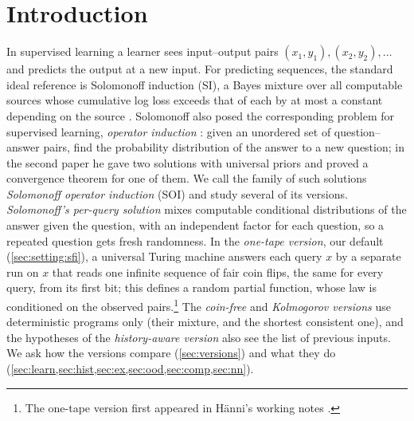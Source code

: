 \section{Introduction}\label{sec:intro}

In supervised learning a learner sees input--output pairs $(x_1,y_1),(x_2,y_2),\dots$ and predicts the output at a new input. For predicting sequences, the standard ideal reference is Solomonoff induction (SI), a Bayes mixture over all computable sources whose cumulative log loss exceeds that of each by at most a constant depending on the source \citep{li2008introduction}. Solomonoff also posed the corresponding problem for supervised learning, \emph{operator induction} \citep{solomonoff1999two,solomonoff2008three}: given an unordered set of question--answer pairs, find the probability distribution of the answer to a new question; in the second paper he gave two solutions with universal priors and proved a convergence theorem for one of them. We call the family of such solutions \emph{Solomonoff operator induction} (SOI) and study several of its versions. \emph{Solomonoff's per-query solution} mixes computable conditional distributions of the answer given the question, with an independent factor for each question, so a repeated question gets fresh randomness. In the \emph{one-tape version}, our default (\cref{sec:setting:sfi}), a universal Turing machine answers each query $x$ by a separate run on $x$ that reads one infinite sequence of fair coin flips, the same for every query, from its first bit; this defines a random partial function, whose law is conditioned on the observed pairs.\footnote{The one-tape version first appeared in H\"anni's working notes \citep{hanni2026notes}.} The \emph{coin-free} and \emph{Kolmogorov versions} use deterministic programs only (their mixture, and the shortest consistent one), and the hypotheses of the \emph{history-aware version} \SFIhist{} also see the list of previous inputs. We ask how the versions compare (\cref{sec:versions}) and what they do (\cref{sec:learn,sec:hist,sec:ex,sec:ood,sec:comp,sec:nn}).


